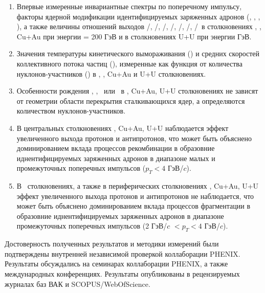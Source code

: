 {}
\begin{enumerate}[beginpenalty=10000] %
	\item Впервые измеренные инвариантные спектры по поперечному импульсу, факторы ядерной модификации идентифицируемых заряженных адронов (\pipm, \Kpm, \prot, \aprot), а также величины отношений выходов \pim/\pip, \Km/\Kp, \prot/\aprot, \prot/\pip, \aprot/\pim, \Kp/\pip, \Km/\pim \ в столкновениях  \pal, \heau, Cu+Au при энергии \sqsn = 200 ГэВ и в столкновениях U+U при энергии  ГэВ. 

	\item Значения температуры кинетического вымораживания (\To) и средних скоростей коллективного потока частиц (\ut), измеренные как функция от количества нуклонов-участников (\Npart) в \pal, \heau, Cu+Au и U+U столкновениях.
	
	\item Особенности рождения \pipm, \Kpm, \prot \ или \aprot \ в \heau, Cu+Au, U+U  столкновениях не зависят от геометрии области перекрытия сталкивающихся ядер, а определяются количеством нуклонов-участников.
	
	\item В центральных столкновениях \heau, Cu+Au, U+U наблюдается эффект увеличенного выхода протонов и антипротонов, что может быть объяснено доминированием вклада процессов рекомбинации в образовние иднентифицируемых заряженных адронов в диапазоне малых и промежуточных поперечных импульсов ($p_{T}<4$ ГэВ/$c$). 
	
	\item В \pal \ столкновениях, а также в периферических столкновениях \heau, Cu+Au, U+U эффект увеличенного выхода протонов и антипротонов не наблюдается, что может быть объяснено доминированием вклада процессов фрагментации в образовние иднентифицируемых заряженных адронов в диапазоне промежуточных поперечных импульсов (2 ГэВ/$c$ $<p_{T}<4$ ГэВ/$c$).
	
\end{enumerate}

{\reliability} Достоверность полученных результатов и методики измерений были подтверждены внутренней независимой проверкой коллаборации PHENIX. Результаты обсуждались на семинарах коллаборации PHENIX, а также международных конференциях. Результаты опубликованы в рецензируемых журналах баз ВАК и SCOPUS/WebOfScience.


